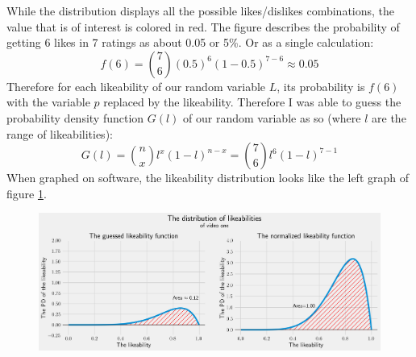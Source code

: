 \documentclass[a4paper,11pt]{article}
\begin{document}
While the distribution displays all the possible likes/dislikes combinations, the value that is of interest is colored in red. The figure describes the probability of getting 6 likes in 7 ratings as about 0.05 or 5\%. Or as a single calculation:
\[
    f(6) = {7 \choose 6} (0.5)^6 (1-0.5)^{7-6} \approx 0.05
\]
Therefore for each likeability of our random variable $L$, its probability is $f(6)$ with the variable $p$ replaced by the likeability. Therefore I was able to guess the probability density function $G(l)$ of our random variable as so (where $l$ are the range of likeabilities):
\[
    G(l) = {n \choose x} l^x (1-l)^{n-x} = {7 \choose 6} l^6 (1-l) ^{7-1}
\]
When graphed on software, the likeability distribution looks like the left graph of figure \ref{fig:beta}.

\begin{figure}[H]
    \centering
    \includegraphics[width=1\textwidth]{assets/beta_pdfs.png}
    \caption{}
    \label{fig:beta}
\end{figure}
\end{document}
